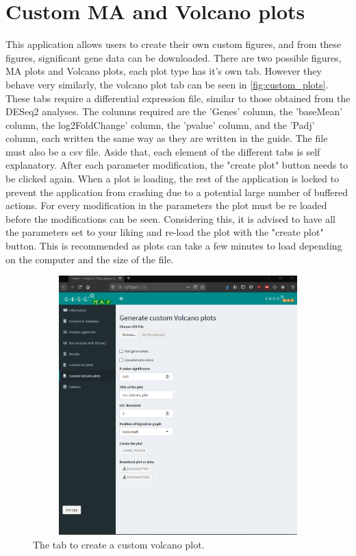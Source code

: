 \documentclass[11pt]{article}
\begin{document}
\section{Custom MA and Volcano plots \label{custom_plots}}
This application allows users to create their own custom figures, and from these figures, significant gene data can be downloaded. There are two possible figures, MA plots and Volcano plots, each plot type has it's own tab. However they behave very similarly, the volcano plot tab can be seen in \autoref{fig:custom_plots}. 
These tabs require a differential expression file, similar to those obtained from the \acrshort{DESeq2} analyses. The columns required are the 'Genes' column, the 'baseMean' column, the log2FoldChange' column, the 'pvalue' column, and the '\acrshort{Padj}' column, each written the same way as they are written in the guide. The file must also be a \acrshort{csv} file.
Aside that, each element of the different tabs is self explanatory. After each parameter modification, the "create plot" button needs to be clicked again. When a plot is loading, the rest of the application is locked to prevent the application from crashing due to a potential large number of buffered actions. For every modification in the parameters the plot must be re loaded before the modifications can be seen. Considering this, it is advised to have all the parameters set to your liking and re-load the plot with the "create plot" button. This is recommended as plots can take a few minutes to load depending on the computer and the size of the file.

\begin{figure}[h!]
\centering
\includegraphics[width=15cm,height=10cm,keepaspectratio]{custom_volcano_tab.png}
\caption{The tab to create a custom volcano plot.}
\label{fig:custom_plots}
\end{figure}
\end{document}
